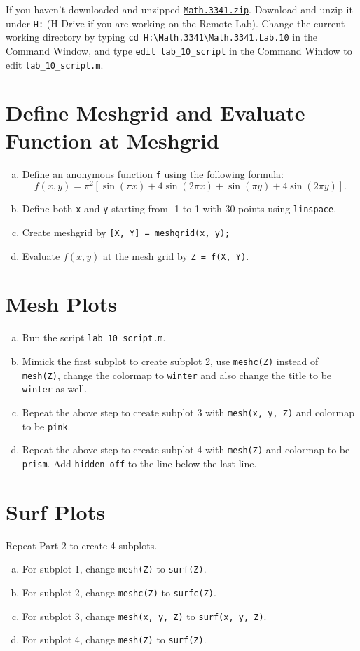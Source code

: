 If you haven't downloaded and unzipped \href{https://libaoj.in/courses/2021f/MATH3341/zip/Math.3341.zip}{\texttt{Math.3341.zip}}. Download and unzip it under \verb|H:| (H Drive if you are working on the Remote Lab). Change the current working directory by typing \verb|cd H:\Math.3341\Math.3341.Lab.10| in the Command Window, and type \verb|edit lab_10_script| in the Command Window to edit \verb|lab_10_script.m|.
%
\section{Define Meshgrid and Evaluate Function at Meshgrid}
\begin{enumerate}[(a)]
    \item Define an anonymous function \verb|f| using the following formula:
        $$
        f(x, y) = \pi^2 [\sin(\pi x) + 4 \sin(2\pi x) + \sin(\pi y) + 4 \sin(2 \pi y)].
        $$
    \item Define both \verb|x| and \verb|y| starting from -1 to 1 with 30 points using \verb|linspace|.
    \item Create meshgrid by \verb|[X, Y] = meshgrid(x, y);|
    \item Evaluate $f(x, y)$ at the mesh grid by \verb|Z = f(X, Y)|.
\end{enumerate}
\section{Mesh Plots}

\begin{enumerate}[(a)]
    \item Run the script \verb|lab_10_script.m|.
    \item Mimick the first subplot to create subplot 2, use \verb|meshc(Z)| instead of \verb|mesh(Z)|, change the colormap to \verb|winter| and also change the title to be \verb|winter| as well.
    \item Repeat the above step to create subplot 3 with \verb|mesh(x, y, Z)| and colormap to be \verb|pink|.
    \item Repeat the above step to create subplot 4 with \verb|mesh(Z)| and colormap to be \verb|prism|. Add \verb|hidden off| to the line below the last line.
\end{enumerate}

\section{Surf Plots}
Repeat Part 2 to create 4 subplots.
\begin{enumerate}[(a)]
    \item For subplot 1, change \verb|mesh(Z)| to \verb|surf(Z)|.
    \item For subplot 2, change \verb|meshc(Z)| to \verb|surfc(Z)|.
    \item For subplot 3, change \verb|mesh(x, y, Z)| to \verb|surf(x, y, Z)|.
    \item For subplot 4, change \verb|mesh(Z)| to \verb|surf(Z)|.
\end{enumerate}

